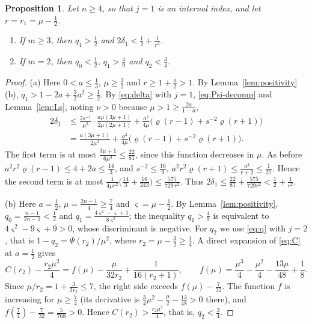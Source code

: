\documentclass[11pt]{amsart}
\newtheorem{proposition}[theorem]{Proposition}
\theoremstyle{definition}
\theoremstyle{remark}
\numberwithin{equation}{section}
\begin{document}
\begin{proposition}\label{prop:boundary}
Let $n\ge4$, so that $j=1$ is an internal index, and let $r=r_1=\mu-\frac12$.
\begin{enumerate}[label=\textup{(\alph*)}]
\item If $m\ge3$, then $q_1>\frac12$ and $2\delta_1<\frac12+\frac1{r^2}$.
\item If $m=2$, then $q_0<\frac12$, $q_1>\frac49$ and $q_2<\frac34$.
\end{enumerate}
\end{proposition}

\begin{proof}
(a) Here $0<a\le\frac13$, $\mu\ge\frac32$ and $r\ge1+\frac a2>1$. By Lemma~\ref{lem:positivity}(b), $q_1>1-2a+\frac32a^2\ge\frac12$. By \eqref{eq:delta} with $j=1$, \eqref{eq:Psi-decomp} and Lemma~\ref{lem:Ls}, noting $\nu>0$ because $\mu>1\ge\frac{2a}{1-a}$,
\begin{align*}
2\delta_1&\le\frac{2s^{-1}}{\mu^2}\cdot\frac{a\mu(3\mu+1)}{2\mu(2\mu+1)}+\frac{a^2}{4\mu}\bigl(\varrho(r-1)+s^{-2}\varrho(r+1)\bigr)\\
&=\frac{a(3\mu+1)}{2\mu^3}+\frac{a^2}{4\mu}\bigl(\varrho(r-1)+s^{-2}\varrho(r+1)\bigr).
\end{align*}
The first term is at most $\frac{3\mu+1}{6\mu^3}\le\frac{22}{81}$, since this function decreases in $\mu$. As before $a^2r^2\varrho(r-1)\le4+2a\le\frac{14}3$, and $s^{-2}\le\frac{16}9$, $a^2r^2\varrho(r+1)\le\frac{a^2}{r+2}\le\frac1{27}$. Hence the second term is at most $\frac{1}{4\mu r^2}\bigl(\frac{14}3+\frac{16}{243}\bigr)\le\frac{575}{729\,r^2}$. Thus $2\delta_1\le\frac{22}{81}+\frac{575}{729r^2}<\frac12+\frac1{r^2}$.

(b) Here $a=\frac12$, $\mu=\frac{2n-1}4\ge\frac74$ and $\varsigma=\mu-\frac12$. By Lemma~\ref{lem:positivity}, $q_0=\frac{n-1}{2n-1}<\frac12$ and $q_1=\frac{4\varsigma^2-\varsigma+1}{8\varsigma^2}$; the inequality $q_1>\frac49$ is equivalent to $4\varsigma^2-9\varsigma+9>0$, whose discriminant is negative. For $q_2$ we use \eqref{eq:q} with $j=2$, that is $1-q_2=\Psi(r_2)/\mu^2$, where $r_2=\mu-\frac32\ge\frac14$. A direct expansion of \eqref{eq:C} at $a=\frac12$ gives
\[
C(r_2)-\frac{r_2\mu^2}4=f(\mu)-\frac{\mu}{32r_2}+\frac1{16(r_2+1)},\qquad f(\mu)=\frac{\mu^3}4-\frac{\mu^2}4-\frac{13\mu}{48}+\frac18.
\]
Since $\mu/r_2=1+\frac{3}{2r_2}\le7$, the right side exceeds $f(\mu)-\frac7{32}$. The function $f$ is increasing for $\mu\ge\frac74$ (its derivative is $\frac34\mu^2-\frac\mu2-\frac{13}{48}>0$ there), and $f(\frac74)-\frac7{32}=\frac5{768}>0$. Hence $C(r_2)>\frac{r_2\mu^2}4$, that is, $q_2<\frac34$.
\end{proof}
\end{document}

